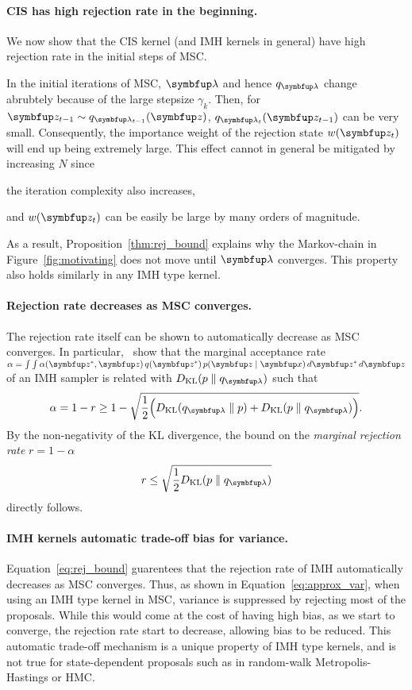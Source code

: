 \paragraph{CIS has high rejection rate in the beginning.}
We now show that the CIS kernel (and IMH kernels in general) have high rejection rate in the initial steps of MSC.
%

%
In the initial iterations of MSC, \(\vlambda\) and hence \(q_{\vlambda}\) change abrubtely because of the large stepsize \(\gamma_k\).
Then, for \(\vz_{t-1} \sim q_{\vlambda_{t-1}}(\vz)\), \(q_{\vlambda_t}(\vz_{t-1})\) can be very small.
Consequently, the importance weight of the rejection state \(w(\vz_t)\) will end up being extremely large.
This effect cannot in general be mitigated by increasing \(N\) since
\begin{enumerate*}[label=(\roman*)]
  \item the iteration complexity also increases,
  \item and \(w(\vz_t)\) can be easily be large by many orders of magnitude.
\end{enumerate*}
As a result, Proposition~\ref{thm:rej_bound} explains why the Markov-chain in Figure~\ref{fig:motivating} does not move until \(\vlambda\) converges.
This property also holds similarly in any IMH type kernel.

\paragraph{Rejection rate decreases as MSC converges.}
The rejection rate itself can be shown to automatically decrease as MSC converges.
In particular,~\citet[Theorem 1]{neklyudov_metropolishastings_2019} show that the marginal acceptance rate \(\alpha = \int \int \alpha(\vz^*,\vz)\,q(\vz^*)\,p(\vz\mid\vx)\,d\vz^*\,d\vz \) of an IMH sampler is related with \(\DKL{p}{q_{\vlambda}}\) such that
\begin{align}
    \alpha = 1 - r \geq 1 - \sqrt{
      \frac{1}{2} \Big(
      \DKL{q_{\vlambda}}{p} + \DKL{p}{q_{\vlambda}}
      \Big)
    }.
\end{align}
By the non-negativity of the KL divergence, the bound on the \textit{marginal rejection rate} \(r=1 - \alpha\) 
\begin{align}
  r
  \leq 
  \sqrt{ \frac{1}{2}
    \DKL{p}{q_{\vlambda}}
  }\label{eq:rej_bound}
\end{align}
directly follows.

\paragraph{IMH kernels automatic trade-off bias for variance.}
Equation~\eqref{eq:rej_bound} guarentees that the rejection rate of IMH automatically decreases as MSC converges.
Thus, as shown in Equation~\eqref{eq:approx_var}, when using an IMH type kernel in MSC, variance is suppressed by rejecting most of the proposals.
While this would come at the cost of having high bias, as we start to converge, the rejection rate start to decrease, allowing bias to be reduced.
This automatic trade-off mechanism is a unique property of IMH type kernels, and is not true for state-dependent proposals such as in random-walk Metropolis-Hastings or HMC.

